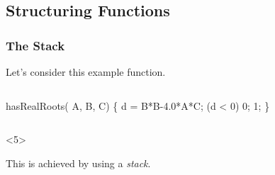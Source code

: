 \documentclass[smaller,table]{beamer}
\begin{document}
\subsection{Structuring Functions}
\begin{frame}[fragile]
\frametitle{The Stack}
Let's consider this example function.
\begin{columns}
\begin{column}{5cm}
\begin{semiverbatim}
 hasRealRoots(\alert<2>{ A},
       \alert<2>{ B,  C})
\{
   \alert<3>{ d} = B*B-4.0*A*C;
    (d < 0) \alert<4>{} 0;
   \alert<4>{} 1;
\}
\end{semiverbatim}
\end{column}
\begin{column}{5cm}
\end{column}
\end{columns}
\vspace{0.1in}
\begin{block}<5>{}
\begin{center}
\alert<5>{This is achieved by using a \emph{stack}.}
\end{center}
\end{block}
\end{frame}
\end{document}
